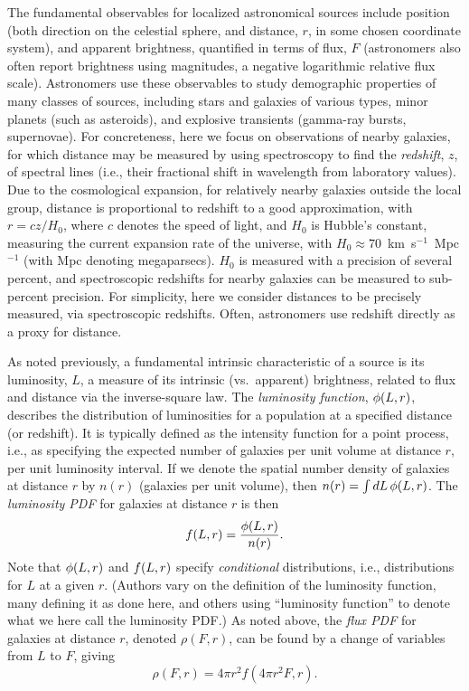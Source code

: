 The fundamental observables for localized astronomical sources include position (both direction on the celestial sphere, and distance, $r$, in some chosen coordinate system), and apparent brightness, quantified in terms of flux, $F$ (astronomers also often report brightness using magnitudes, a negative logarithmic relative flux scale).
Astronomers use these observables to study demographic properties of many classes of sources, including stars and galaxies of various types, minor planets (such as asteroids), and explosive transients (gamma-ray bursts, supernovae).
For concreteness, here we focus on observations of nearby galaxies, for which distance may be measured by using spectroscopy to find the \emph{redshift}, $z$, of spectral lines (i.e., their fractional shift in wavelength from laboratory values).
Due to the cosmological expansion, for relatively nearby galaxies outside the local group, distance is proportional to redshift to a good approximation, with
$r = cz/H_0$,
where $c$ denotes the speed of light, and $H_0$ is Hubble's constant, measuring the current expansion rate of the universe, with $H_0 \approx 70$~km~s$^{-1}$~Mpc$^{-1}$ (with Mpc denoting megaparsecs).
$H_0$ is measured with a precision of several percent, and spectroscopic redshifts for nearby galaxies can be measured to sub-percent precision.
For simplicity, here we consider distances to be precisely measured, via spectroscopic redshifts.
Often, astronomers use redshift directly as a proxy for distance.

As noted previously, a fundamental intrinsic characteristic of a source is its luminosity, $L$, a measure of its intrinsic (vs.\ apparent) brightness, related to flux and distance via the inverse-square law.
The \emph{luminosity function}, $\phi(L, r)$, describes the distribution of luminosities for a population at a specified distance (or redshift).
It is typically defined as the intensity function for a point process, i.e., as specifying the expected number of galaxies per unit volume at distance $r$, per unit luminosity interval.
If we denote the spatial number density of galaxies at distance $r$ by $n(r)$ (galaxies per unit volume), then $n(r) = \int dL\, \phi(L, r)$.
The \emph{luminosity PDF} for galaxies at distance $r$ is then
\begin{equation}
f(L,r) = \frac{\phi(L, r)}{n(r)}.
\label{eq:lpdf}
\end{equation}
Note that $\phi(L,r)$ and $f(L,r)$ specify \emph{conditional} distributions, i.e., distributions for $L$ at a given $r$.
(Authors vary on the definition of the luminosity function, many defining it as done here, and others using ``luminosity function'' to denote what we here call the luminosity PDF.)
As noted above, the \emph{flux PDF} for galaxies at distance $r$, denoted $\rho(F,r)$, can be found by a change of variables from $L$ to $F$, giving
\begin{equation}\label{eq:fluxPDF}
\rho(F,r) = 4\pi r^2 f(4\pi r^2 F, r).
\end{equation}

